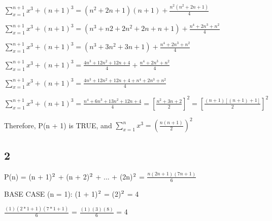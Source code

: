 \documentclass{article}
\begin{document}

\noindent
$\sum_{x=1}^{n + 1} x^3 + (n+1)^3 = (n^2 + 2n + 1)(n+1) + \frac{n^2(n^2 + 2n + 1)}{4}$


\noindent 
$\sum_{x=1}^{n + 1} x^3  + (n + 1)^3 = (n^3 + n2 + 2n^2 + 2n + n + 1) + \frac{n^4 + 2n^3 + n^2}{4} $ \vspace{0.5cm}

\noindent $\sum_{x=1}^{n + 1} x^3  + (n + 1)^3 = (n^3 + 3n^2 + 3n + 1) + \frac{n^4 + 2n^3 + n^2}{4}$ \vspace{0.5cm}

\noindent $\sum_{x=1}^{n + 1} x^3 + (n + 1)^3 = \frac{4n^3 + 12n^2 + 12n + 4}{4} + \frac{n^4 + 2n^3 + n^2}{4}$\vspace{0.5cm}

\noindent $\sum_{x=1}^{n + 1} x^3 + (n + 1)^3 = \frac{4n^3 + 12n^2 + 12n + 4 + n^4 + 2n^3 + n^2}{4}$ \vspace{0.5cm}

\noindent $\sum_{x=1}^{n + 1} x^3 + (n + 1)^3 = \frac{n^4 + 6n^3 + 13n^2 + 12n + 4}{4} = [\frac{n^2 + 3n + 2}{2}]^2 = [\frac{(n + 1)[(n + 1) + 1]}{2}]^2$ \vspace{0.5cm}

\noindent Therefore, P(n + 1) is TRUE, and $\sum_{x=1}^{n} x^3 = (\frac{n(n + 1)}{2})^2$

\subsection{2}

\noindent P(n) = (n + 1)$\textsuperscript{2}$ + (n + 2)$\textsuperscript{2}$ + ... + (2n)$\textsuperscript{2}$  = $\frac{n(2n + 1)(7n + 1)}{6}$ \vspace{0.5cm}

\noindent BASE CASE (n = 1): (1 + 1)$\textsuperscript{2}$ = (2)$\textsuperscript{2}$ = 4 \vspace{0.5cm}

\noindent $\frac{(1)(2 * 1 + 1)(7 * 1 + 1)}{6}$ = $\frac{(1)(3)(8)}{6}$ = 4 \vspace{0.5cm}
\end{document}
